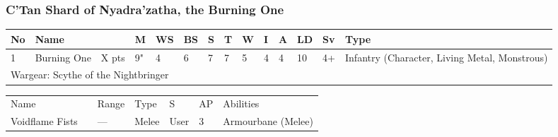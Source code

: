 



\newpage
\subsubsection{C'Tan Shard of Nyadra'zatha, the Burning One}

\noindent
\begin{tabular}{||m{10pt} m{90pt} m{30pt} m{11pt} m{11pt} m{11pt} m{11pt} m{11pt} m{11pt} m{11pt} m{11pt} m{11pt} m{11pt} m{135pt}||}
	\hline
	No & Name & & M & WS & BS & S & T & W & I & A & LD & Sv & Type \\
	\hline
	1 & Burning One & X pts & 9" & 4 & 6 & 7 & 7 & 5 & 4 & 4 & 10 & 4+ & Infantry (Character, Living Metal, Monstrous)\\
	\hline
	\hline
	\multicolumn{14}{||Z{532 pt}||}{Wargear: Scythe of the Nightbringer}\\
	\hline
\end{tabular}

\noindent
\begin{tabular}{||m{140pt} m{0pt} m{31pt} m{55pt} m{12pt} m{12pt} m{210pt}||}
	\hline
	Name & & Range & Type & S & AP & Abilities \\
	Voidflame Fists & & — & Melee & User & 3 & Armourbane (Melee) \\
	\hline	
	\hline
\end{tabular}

